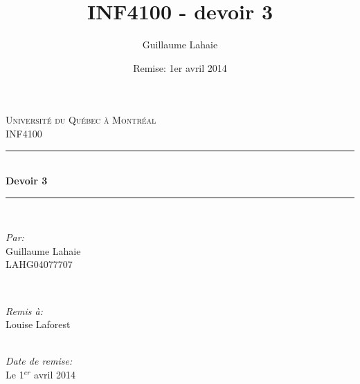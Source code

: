 \documentclass[10.9pt]{article} %
\title{INF4100 - devoir 3}
\author{Guillaume Lahaie}
\date{Remise: 1er avril 2014}
\newcommand\blankpage{%
  \null
  \thispagestyle{empty}%
  \addtocounter{page}{-1}%
  \newpage}
\begin{document}
\fussy


\begin{titlepage}

\newcommand{\HRule}{\rule{\linewidth}{0.5mm}} %

\center %

\textsc{\LARGE Université du Québec à Montréal}\\[1.5cm] %
\textsc{\Large INF4100}\\[0.5cm] %

\HRule \\[1.5cm]
{ \huge \bfseries Devoir 3}\\[0.4cm] %
\HRule \\[1.5cm]

\begin{minipage}{0.4\textwidth}
\begin{flushleft} \large
\emph{Par:}\\
Guillaume Lahaie \\ LAHG04077707 %
\end{flushleft}
\end{minipage}
~
\begin{minipage}{0.4\textwidth}
\begin{flushright} \large
\emph{Remis à:} \\
Louise Laforest %
\end{flushright}
\end{minipage}\\[4cm]

{\large \emph{Date de remise:} \\ Le 1$^{er}$ avril 2014}\\[3cm] %


\vfill %

\end{titlepage}
\blankpage
\end{document}
